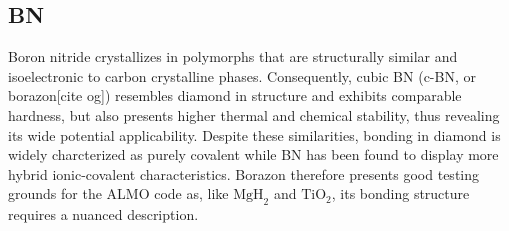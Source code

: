 \documentclass[aps,prb,twocolumn,amsmath,amssymb,superscriptaddress,longbibliography]{revtex4-1}
\newcommand{\Ns}{\mathbb{N}^{*}}
\newcommand{\C}{\mathbb{C}}
\begin{document}





 



\subsection*{BN}

Boron nitride crystallizes in polymorphs that are structurally similar and isoelectronic to carbon crystalline phases. 
Consequently, cubic BN (c-BN, or borazon[cite og]) resembles diamond in structure and exhibits comparable hardness, but also presents higher thermal and chemical stability, thus revealing its wide potential applicability.
Despite these similarities, bonding in diamond is widely charcterized as purely covalent while BN has been found to display more hybrid ionic-covalent characteristics.
Borazon therefore presents good testing grounds for the ALMO code as, like $\text{MgH}_{2}$ and $\text{TiO}_{2}$, its bonding structure requires a nuanced description.
\end{document}
